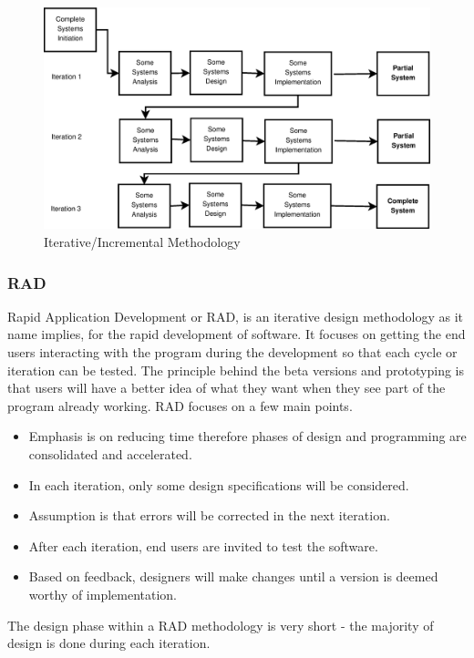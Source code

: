 \documentclass[table,a4paper,oneside]{book}
\begin{document}
\begin{figure}[htp]
\begin{center}
	\includegraphics[width=15cm]{./Images/Iterative}
	\caption{Iterative/Incremental Methodology}
	\label{fig:Iterative}
\end{center}
\end{figure}

\subsubsection{RAD}
Rapid Application Development or RAD, is an iterative design methodology as it name implies, for the rapid development of software. It focuses on getting the end users interacting with the program during the development so that each cycle or iteration can be tested. The principle behind the beta versions and prototyping is that users will have a better idea of what they want when they see part of the program already working. RAD focuses on a few main points.
\begin{itemize}
\item Emphasis is on reducing time therefore phases of design and programming are consolidated and accelerated.
\item In each iteration, only some design specifications will be considered.
\item Assumption is that errors will be corrected in the next iteration.
\item After each iteration, end users are invited to test the software.
\item Based on feedback, designers will make changes until a version is deemed worthy of implementation.
\end{itemize}
The design phase within a RAD methodology is very short - the majority of design is done during each iteration.
\end{document}
